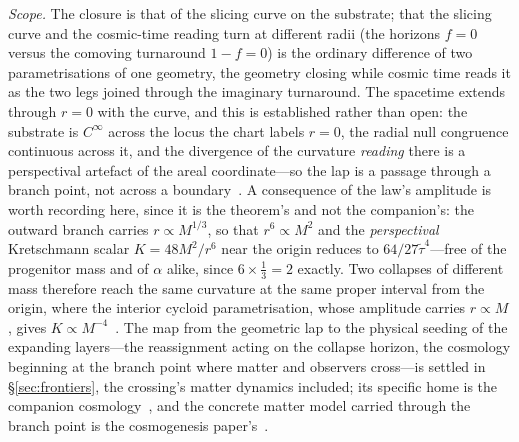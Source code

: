\documentclass[11pt,a4paper]{article}
\theoremstyle{plain}
\theoremstyle{definition}
\theoremstyle{remark}
\begin{document}
\noindent\emph{Scope.} The closure is that of the slicing curve on the substrate; that the slicing curve and the cosmic-time reading turn at different radii (the horizons $f=0$ versus the comoving turnaround $1-f=0$) is the ordinary difference of two parametrisations of one geometry, the geometry closing while cosmic time reads it as the two legs joined through the imaginary turnaround. The spacetime extends through $r=0$ with the curve, and this is established rather than open: the substrate is $C^{\infty}$ across the locus the chart labels $r=0$, the radial null congruence continuous across it, and the divergence of the curvature \emph{reading} there is a perspectival artefact of the areal coordinate---so the lap is a passage through a branch point, not across a boundary~\cite{JanzenSlicing,JanzenCircle}. A consequence of the law's amplitude is worth recording here, since it is the theorem's and not the
companion's: the outward branch carries $r\propto M^{1/3}$, so that $r^{6}\propto M^{2}$ and the \emph{perspectival} Kretschmann scalar $K=48M^{2}/r^{6}$ near the origin reduces to $64/27\tilde\tau^{4}$---free of the progenitor mass and
of $\alpha$ alike, since $6\times\tfrac13=2$ exactly. Two collapses of different mass therefore reach the same
curvature at the same proper interval from the origin, where the interior cycloid parametrisation, whose
amplitude carries $r\propto M$, gives $K\propto M^{-4}$~\cite{JanzenCircle}. The map from the geometric lap to the physical seeding of the expanding layers---the reassignment acting on the collapse horizon, the cosmology beginning at the branch point where matter and observers cross---is settled in \S\ref{sec:frontiers}, the crossing's matter dynamics included; its specific home is the companion cosmology~\cite{JanzenCRcosmology}, and the concrete matter model carried through the branch point is the cosmogenesis paper's~\cite{JanzenCosmogenesis}.
\end{document}
